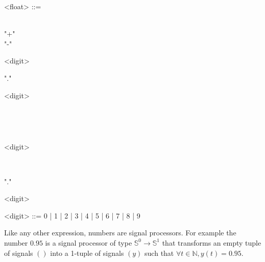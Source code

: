 \documentclass[a4paper,10pt]{book}
\begin{document}
\begin{grammar}
  <float> ::= 
  \begin{syntdiag}
    \begin{stack}
      \\ "+" \\ "-"
    \end{stack}
    \begin{stack}
      \begin{rep}<digit>\end{rep} "." \begin{stack} \begin{rep}<digit>\end{rep} \\ \end{stack} \\
      \begin{stack} \begin{rep}<digit>\end{rep} \\ \end{stack} "." \begin{rep}<digit>\end{rep}
    \end{stack}
  \end{syntdiag}
\end{grammar}

\begin{grammar}
  <digit> ::= 
  0 | 1 | 2 | 3 | 4 | 5 | 6 | 7 | 8 | 9
\end{grammar}


\bigskip

Like any other \faust expression, numbers are signal processors. For example the number $0.95$ is a signal processor of type $\mathbb{S}^{0}\rightarrow\mathbb{S}^{1}$ that transforms an empty tuple of signals $()$ into a 1-tuple of signals $(y)$ such that $\forall t\in\mathbb{N}, y(t)=0.95$.



\end{document}
